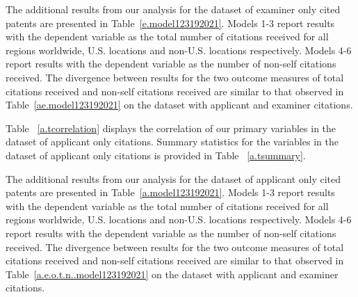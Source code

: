 \documentclass[12pt,letterpaper]{article}
\begin{document}







The additional results from our analysis for the dataset of examiner only cited patents are presented in Table~\ref{e.model123192021}. Models 1-3 report results with the dependent variable as the total number of citations received for all regions worldwide, U.S. locations and non-U.S. locations respectively. Models 4-6 report results with the dependent variable as the number of non-self citations received. The divergence between results for the two outcome measures of total citations received and non-self citations received are similar to that observed in Table~\ref{ae.model123192021} on the dataset with applicant and examiner citations. \par





Table ~\ref{a.tcorrelation} displays the correlation of our primary variables in the dataset of applicant only citations. Summary statistics for the variables in the dataset of applicant only citations is provided in Table ~\ref{a.tsummary}.








The additional results from our analysis for the dataset of applicant only cited patents are presented in Table~\ref{a.model123192021}. Models 1-3 report results with the dependent variable as the total number of citations received for all regions worldwide, U.S. locations and non-U.S. locations respectively. Models 4-6 report results with the dependent variable as the number of non-self citations received. The divergence between results for the two outcome measures of total citations received and non-self citations received are similar to that observed in Table~\ref{a.e.o.t.n..model123192021} on the dataset with applicant and examiner citations. \par










\end{document}
